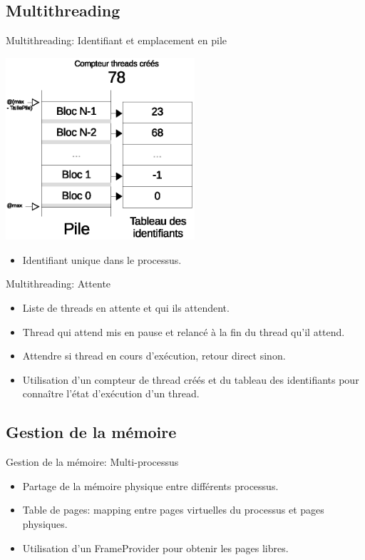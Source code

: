 \documentclass{beamer}
\begin{document}
\subsection{Multithreading}
\begin{frame}{Multithreading: Identifiant et emplacement en pile}
	\begin{center}
    	\includegraphics[width=7cm]{../rapport/schema_threads_id.eps}
	\end{center}
   \begin{itemize}
       \item Identifiant unique dans le processus.
   \end{itemize}
\end{frame}

\begin{frame}{Multithreading: Attente}
   \begin{itemize}
       \item Liste de threads en attente et qui ils attendent.
		\item Thread qui attend mis en pause et relancé à la fin du thread qu'il attend.
       \item Attendre si thread en cours d'exécution, retour direct sinon.
       \item Utilisation d'un compteur de thread créés et du tableau des identifiants pour connaître l'état d'exécution d'un thread.
   \end{itemize}
\end{frame}


\subsection{Gestion de la mémoire}
\begin{frame}{Gestion de la mémoire: Multi-processus}
    \begin{itemize}
        \item Partage de la mémoire physique entre différents processus.
        \item Table de pages: mapping entre pages virtuelles du processus et pages physiques.
        \item Utilisation d'un FrameProvider pour obtenir les pages libres.
    \end{itemize}
\end{frame}
\end{document}
